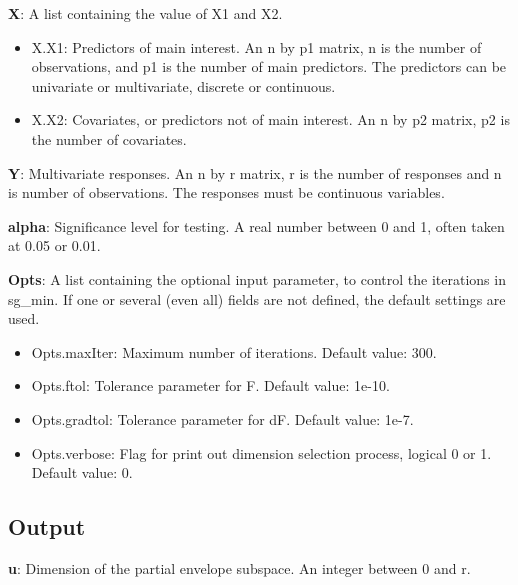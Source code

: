 \documentclass[a4paper,11pt,openany]{memoir}
\begin{document}
\begin{par}
\textbf{X}: A list containing the value of X1 and X2.
\end{par} \vspace{1em}
\begin{itemize}
\setlength{\itemsep}{-1ex}
   \item X.X1: Predictors of main interest. An n by p1 matrix, n is the number of observations, and p1 is the number of main predictors. The predictors can be univariate or multivariate, discrete or continuous.
   \item X.X2: Covariates, or predictors not of main interest.  An n by p2 matrix, p2 is the number of covariates.
\end{itemize}
\begin{par}
\textbf{Y}: Multivariate responses. An n by r matrix, r is the number of responses and n is number of observations. The responses must be continuous variables.
\end{par} \vspace{1em}
\begin{par}
\textbf{alpha}: Significance level for testing.  A real number between 0 and 1, often taken at 0.05 or 0.01.
\end{par} \vspace{1em}
\begin{par}
\textbf{Opts}: A list containing the optional input parameter, to control the iterations in sg\_min. If one or several (even all) fields are not defined, the default settings are used.
\end{par} \vspace{1em}
\begin{itemize}
\setlength{\itemsep}{-1ex}
   \item Opts.maxIter: Maximum number of iterations.  Default value: 300.
   \item Opts.ftol: Tolerance parameter for F.  Default value: 1e-10.
   \item Opts.gradtol: Tolerance parameter for dF.  Default value: 1e-7.
   \item Opts.verbose: Flag for print out dimension selection process, logical 0 or 1. Default value: 0.
\end{itemize}


\subsection*{Output}

\begin{par}
\textbf{u}: Dimension of the partial envelope subspace. An integer between 0 and r.
\end{par} \vspace{1em}
\end{document}
